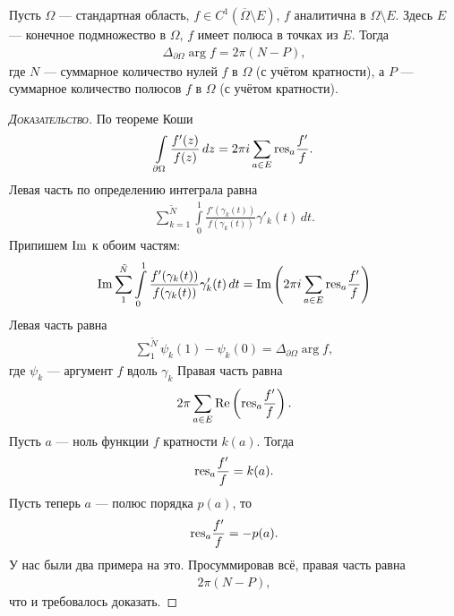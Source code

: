 \documentclass[../complex-analysis.tex]{subfiles}
\begin{document}
\begin{thm}
 Пусть $ \Omega $ --- стандартная область, $ f \in C^{1}(\overline \Omega \setminus E) $, $ f $ аналитична в $ \Omega \setminus E $. Здесь $ E $ --- конечное подмножество в $ \Omega $, $ f $ имеет полюса в точках из $ E $. Тогда
 \begin{align*}
  \Delta_{\partial \Omega} \arg f = 2\pi(N - P),
 \end{align*} где $ N $ --- суммарное количество нулей $ f $ в $ \Omega $ (с учётом кратности), а $ P $ --- суммарное количество  полюсов $ f $ в $ \Omega $ (с учётом кратности).
\end{thm}
\begin{proof}[\normalfont\textsc{Доказательство}]
 По теореме Коши
 \begin{align*}
  \int\limits_{\partial\Omega} \frac{f'(z)}{f(z)} \,dz = 2\pi i \sum_{a \in E} \mathrm{res}_a \frac{f'}{f}.
 \end{align*} Левая часть по определению интеграла равна
 \begin{align*}
  \sum_{k=1}^{\tilde N} \int\limits_{0}^{1} \frac{f'(\gamma_k(t))}{f(\gamma_k(t))}\gamma'_k(t)\,dt.
 \end{align*} Припишем $ \operatorname{Im}$ к обоим частям:
 \begin{align*}
  \operatorname{Im} \sum_{1}^{\tilde N} \int\limits_{0}^{1} \frac{f'(\gamma_k(t))}{f(\gamma_k(t))}\gamma'_k(t)\,dt = \operatorname{Im} \left( 2\pi i \sum_{a \in E}\mathrm{res}_a \frac{f'}{f} \right)
 \end{align*} Левая часть равна
 \begin{align*}
  \sum_{1}^{\tilde N} \psi_k(1) - \psi_k(0) = \Delta_{\partial \Omega} \arg f,
 \end{align*} где $ \psi_k $ --- аргумент $ f $ вдоль $ \gamma_k $ Правая часть равна
 \begin{align*}
  2\pi \sum_{a \in E} \operatorname{Re} \left( \mathrm{res}_a \frac{f'}{f} \right).
 \end{align*} Пусть $ a $ --- ноль функции $ f $ кратности $ k(a) $. Тогда
 \begin{align*}
  \mathrm{res}_a \frac{f'}{f} = k(a).
 \end{align*} Пусть теперь $ a $ --- полюс порядка $ p(a) $, то
 \begin{align*}
  \mathrm{res}_a \frac{f'}{f} = -p(a).
 \end{align*} У нас были два примера на это. Просуммировав всё, правая часть равна
 \begin{align*}
  2\pi (N-P),
 \end{align*} что и требовалось доказать.
\end{proof}
\end{document}
